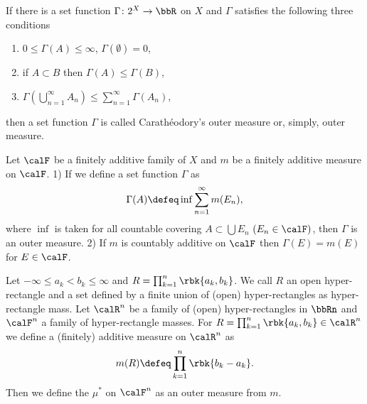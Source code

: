 \documentclass[openany, a4paper, oneside]{jsbook}
\begin{document}
\begin{defn}
 If there is a set function $\Gamma \colon 2^X \to \bbR$ on $X$ and $\Gamma$ satisfies the following three conditions
\begin{enumerate}
\item {} $0 \leq \Gamma (A) \leq \infty$, $\Gamma (\emptyset) = 0$,
\item {} if $A \subset B$ then $\Gamma (A) \leq \Gamma (B)$,
\item {} $\Gamma (\bigcup_{n=1}^{\infty} A_n) \leq \sum_{n=1}^{\infty} \Gamma (A_n)$,
\end{enumerate}
then a set function $\Gamma$ is called Carath\'eodory's outer measure or, simply, outer measure.
\end{defn}
\begin{thm}
 Let $\calF$ be a finitely additive family of $X$ and $m$ be a finitely additive measure on $\calF$.
 1) If we define a set function $\Gamma$ as
    \begin{align}
     \Gamma (A)
     \defeq
     \inf \sum_{n=1}^{\infty} m (E_n),
    \end{align}
    where $\inf$ is taken for all countable covering $A \subset \bigcup E_n$ $(E_n \in \calF)$,
    then $\Gamma$ is an outer measure.
 2) If $m$ is countably additive on $\calF$ then $\Gamma (E) = m (E)$ for $E \in \calF$.
\end{thm}
Let $- \infty \leq a_k < b_k \leq \infty$ and $R = \prod_{k=1}^{n} \rbk{a_k, b_k}$.
We call $R$ an open hyper-rectangle and a set defined by a finite union of (open) hyper-rectangles as hyper-rectangle mass.
Let $\calR^n$ be a family of (open) hyper-rectangles in $\bbRn$ and $\calF^n$ a family of hyper-rectangle masses.
For $R = \prod_{k=1}^{n} \rbk{a_k, b_k} \in \calR^n$ we define a (finitely) additive measure on $\calR^n$ as
\begin{align}
 m (R)
 \defeq
 \prod_{k=1}^n \rbk{b_k - a_k}.
\end{align}
Then we define the  $\mu^*$ on $\calF^n$ as an outer measure from $m$.
\end{document}
